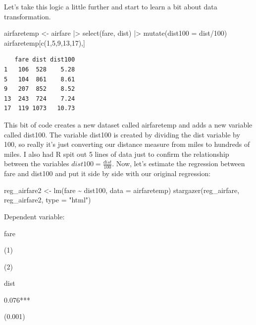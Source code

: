 \documentclass[
  letterpaper,
]{book}
\newenvironment{Shaded}{\begin{snugshade}}{\end{snugshade}}
\newcommand{\AttributeTok}[1]{\textcolor[rgb]{0.40,0.45,0.13}{#1}}
\newcommand{\DecValTok}[1]{\textcolor[rgb]{0.68,0.00,0.00}{#1}}
\newcommand{\FunctionTok}[1]{\textcolor[rgb]{0.28,0.35,0.67}{#1}}
\newcommand{\NormalTok}[1]{\textcolor[rgb]{0.00,0.23,0.31}{#1}}
\newcommand{\OtherTok}[1]{\textcolor[rgb]{0.00,0.23,0.31}{#1}}
\newcommand{\SpecialCharTok}[1]{\textcolor[rgb]{0.37,0.37,0.37}{#1}}
\newcommand{\StringTok}[1]{\textcolor[rgb]{0.13,0.47,0.30}{#1}}
\begin{document}
Let's take this logic a little further and start to learn a bit about
data transformation.

\begin{Shaded}
\begin{Highlighting}[]
\NormalTok{airfaretemp }\OtherTok{\textless{}{-}}\NormalTok{ airfare }\SpecialCharTok{|\textgreater{}}  
    \FunctionTok{select}\NormalTok{(fare, dist) }\SpecialCharTok{|\textgreater{}}  
    \FunctionTok{mutate}\NormalTok{(}\AttributeTok{dist100 =}\NormalTok{ dist}\SpecialCharTok{/}\DecValTok{100}\NormalTok{)}
\NormalTok{airfaretemp[}\FunctionTok{c}\NormalTok{(}\DecValTok{1}\NormalTok{,}\DecValTok{5}\NormalTok{,}\DecValTok{9}\NormalTok{,}\DecValTok{13}\NormalTok{,}\DecValTok{17}\NormalTok{),]}
\end{Highlighting}
\end{Shaded}

\begin{verbatim}
   fare dist dist100
1   106  528    5.28
5   104  861    8.61
9   207  852    8.52
13  243  724    7.24
17  119 1073   10.73
\end{verbatim}

This bit of code creates a new dataset called airfaretemp and adds a new
variable called dist100. The variable dist100 is created by dividing the
dist variable by 100, so really it's just converting our distance
measure from miles to hundreds of miles. I also had R spit out 5 lines
of data just to confirm the relationship between the variables
\(dist100=\frac{dist}{100}\). Now, let's estimate the regression between
fare and dist100 and put it side by side with our original regression:

\begin{Shaded}
\begin{Highlighting}[]
\NormalTok{reg\_airfare2 }\OtherTok{\textless{}{-}} \FunctionTok{lm}\NormalTok{(fare }\SpecialCharTok{\textasciitilde{}}\NormalTok{ dist100, }\AttributeTok{data =}\NormalTok{ airfaretemp)}
\FunctionTok{stargazer}\NormalTok{(reg\_airfare, reg\_airfare2, }\AttributeTok{type =} \StringTok{"html"}\NormalTok{)}
\end{Highlighting}
\end{Shaded}

Dependent variable:

fare

(1)

(2)

dist

0.076***

(0.001)
\end{document}
